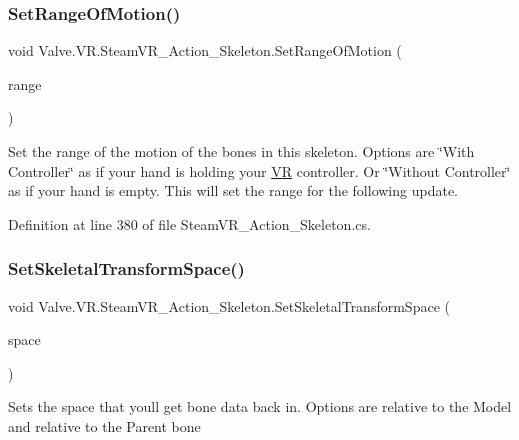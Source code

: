 \subsubsection{\texorpdfstring{SetRangeOfMotion()}{SetRangeOfMotion()}}
{\footnotesize\ttfamily void Valve.\+V\+R.\+Steam\+V\+R\+\_\+\+Action\+\_\+\+Skeleton.\+Set\+Range\+Of\+Motion (\begin{DoxyParamCaption}\item[{\mbox{\hyperlink{namespace_valve_1_1_v_r_affc8d18345f8f5d36f1ae7b4ce534500}{E\+V\+R\+Skeletal\+Motion\+Range}}}]{range }\end{DoxyParamCaption})}



Set the range of the motion of the bones in this skeleton. Options are \char`\"{}\+With Controller\char`\"{} as if your hand is holding your \mbox{\hyperlink{namespace_valve_1_1_v_r}{VR}} controller. Or \char`\"{}\+Without Controller\char`\"{} as if your hand is empty. This will set the range for the following update. 



Definition at line 380 of file Steam\+V\+R\+\_\+\+Action\+\_\+\+Skeleton.\+cs.

\mbox{\label{class_valve_1_1_v_r_1_1_steam_v_r___action___skeleton_a4cc01960830d09746b0b5b6f43dfc8ab}} 
\subsubsection{\texorpdfstring{SetSkeletalTransformSpace()}{SetSkeletalTransformSpace()}}
{\footnotesize\ttfamily void Valve.\+V\+R.\+Steam\+V\+R\+\_\+\+Action\+\_\+\+Skeleton.\+Set\+Skeletal\+Transform\+Space (\begin{DoxyParamCaption}\item[{\mbox{\hyperlink{namespace_valve_1_1_v_r_a916744fb3fc7b8e8ba224fba9bee6de4}{E\+V\+R\+Skeletal\+Transform\+Space}}}]{space }\end{DoxyParamCaption})}



Sets the space that you\textquotesingle{}ll get bone data back in. Options are relative to the Model and relative to the Parent bone 


